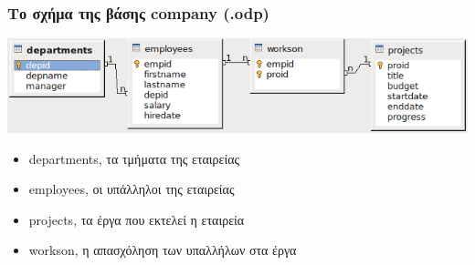 \begin{frame}
\frametitle{Το σχήμα της βάσης {\en company (.odp)} }
\includegraphics[scale=0.65]{../common/company1-REL-odp.png} \\
\bigskip
\begin{minipage}{0.92\textwidth}
\begin{itemize} \itemsep 9pt
  \item {\ra departments}, τα τμήματα της εταιρείας
  \item {\ra employees}, οι υπάλληλοι της εταιρείας
  \item {\ra projects}, τα έργα που εκτελεί η εταιρεία
  \item {\ra workson}, η απασχόληση των υπαλλήλων στα έργα
\end{itemize}
\end{minipage}
\end{frame}
